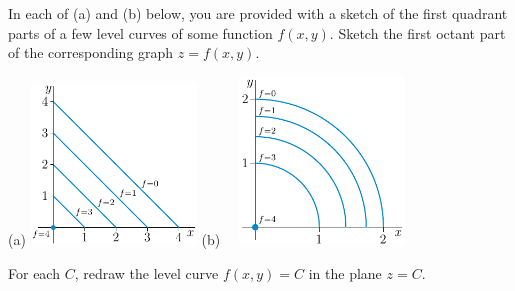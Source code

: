 \begin{question}
In each of (a) and (b) below, you are provided with a sketch of the first quadrant parts of a few level curves of some function $f(x,y)$.
Sketch the first octant part of the corresponding graph $z=f(x,y)$.
\begin{center}
 (a) \raisebox{-0.5\height}
           {\includegraphics[width=0.33\textwidth, height=0.3\textwidth]
                                                   {fig/planeLevelA.pdf}}
\qquad
  (b)\ \ \raisebox{-0.5\height}
            {\includegraphics[width=0.33\textwidth, height=0.33\textwidth]
                                                   {fig/paraboloidLevelA.pdf}}
\end{center}
\end{question}

\begin{hint}
For each $C$, redraw the level curve $f(x,y)=C$ in the plane $z=C$.
\end{hint}


